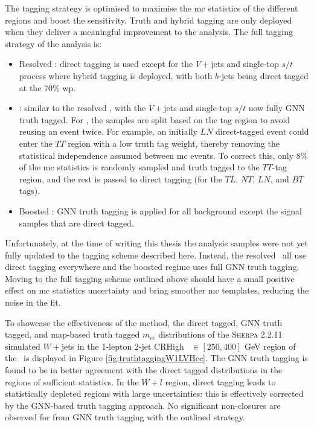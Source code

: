 The tagging strategy is optimised to maximise the \gls{mc} statistics of the different regions and boost the sensitivity. Truth and hybrid tagging are only deployed when they deliver a meaningful improvement to the analysis. The full tagging strategy of the analysis is:
\begin{itemize}
  \item Resolved \vhb: direct tagging is used except for the $V+$jets and single-top $s/t$ process where hybrid tagging is deployed, with both $b$-jets being direct tagged at the 70\% \gls{wp}.
  \item \vhc: similar to the resolved \vhb, with the $V+$jets and single-top $s/t$ now fully GNN truth tagged. For \vhc, the samples are split based on the tag region to avoid reusing an event twice. For example, an initially $LN$ direct-tagged event could enter the $TT$ region with a low truth tag weight, thereby removing the statistical independence assumed between \gls{mc} events. To correct this, only 8\% of the \gls{mc} statistics is randomly sampled and truth tagged to the $TT$-tag region, and the rest is passed to direct tagging (for the $TL$, $NT$, $LN$, and $BT$ tags). 
  \item Boosted \vhb: GNN truth tagging is applied for all background except the signal samples that are direct tagged.
\end{itemize}
Unfortunately, at the time of writing this thesis the analysis samples were not yet fully updated to the tagging scheme described here. Instead, the resolved \vhbc\ all use direct tagging everywhere and the boosted regime uses full GNN truth tagging. Moving to the full tagging scheme outlined above should have a small positive effect on \gls{mc} statistics uncertainty and bring smoother \gls{mc} templates, reducing the noise in the fit.

To showcase the effectiveness of the method, the direct tagged, GNN truth tagged, and map-based truth tagged $m_{cc}$ distributions of the \textsc{Sherpa} 2.2.11 simulated $W+$jets in the 1-lepton 2-jet CRHigh \ptv\ $\in [250, 400]$ GeV region of the \vhc\ is displayed in Figure \ref{fig:truthtaggingW1LVHcc}. The GNN truth tagging is found to be in better agreement with the direct tagged distributions in the regions of sufficient statistics. In the $W+l$ region, direct tagging leads to statistically depleted regions with large uncertainties: this is effectively corrected by the GNN-based truth tagging approach. No significant non-closures are observed for from GNN truth tagging with the outlined strategy.

